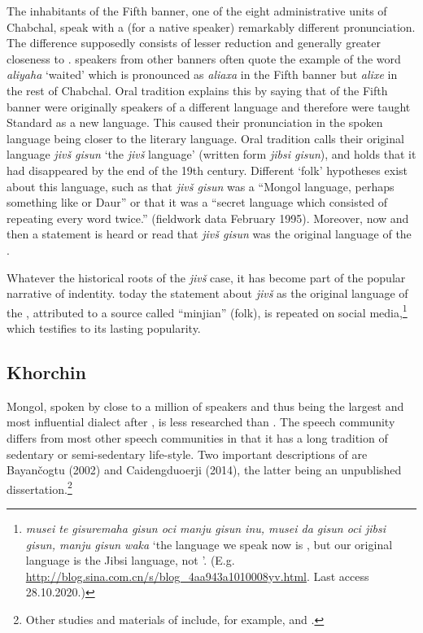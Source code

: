 \documentclass[output=paper,colorlinks,citecolor=brown]{langscibook}
\begin{document}
The inhabitants of the Fifth banner, one of the eight administrative units of Chabchal, speak  with a (for a native speaker) remarkably different pronunciation. The difference supposedly consists of lesser reduction and generally greater closeness to .  speakers from other banners often quote the example of the  word \textit{aliyaha} ‘waited’  which is pronounced as \textit{aliaxa} in the Fifth banner but \textit{alixe} in the rest of Chabchal. Oral tradition explains this by saying that  of the Fifth banner were originally speakers of a different language and therefore were taught Standard  as a new language. This caused their pronunciation in the spoken language being closer to the literary language. Oral tradition calls their original language \textit{jivš gisun} ‘the \textit{jivš} language’ (written form \textit{jibsi gisun}), and holds that it had disappeared by the end of the 19th century. Different ‘folk’ hypotheses exist about this language, such as that \textit{jivš gisun} was a “Mongol language, perhaps something like  or Daur” or that it was a “secret language which consisted of repeating every word twice.” (fieldwork data February 1995). Moreover, now and then a statement is heard or read that \textit{jivš gisun} was the original language of the .
 
Whatever the historical roots of the \textit{jivš} case, it has become part of the popular narrative of  indentity.  today the statement about \textit{jivš} as the original language of the , attributed to a source called “minjian” (folk), is repeated on  social media,\footnote{\textit{musei te gisuremaha gisun oci manju gisun inu, musei da gisun oci jibsi gisun, manju gisun waka} `the language we speak now is , but our original language is the Jibsi language, not '. (E.g. \url{http://blog.sina.com.cn/s/blog_4aa943a1010008yv.html}. Last access 28.10.2020.)} which testifies to its lasting popularity.

\subsection{Khorchin}

 Mongol, spoken by close to a million of speakers and thus being the largest and most influential  dialect after , is less researched than . The  speech community differs from most other  speech communities in that it has a long tradition of sedentary or semi-sedentary life-style.  Two important descriptions of  are Bayančogtu (2002) and Caidengduoerji (2014), the latter being an unpublished dissertation.\footnote{Other studies and materials of  include, for example, \citet{Brosig2014a, Brosig2014b} and \citet{Yamakoshi2015}.}
\end{document}
